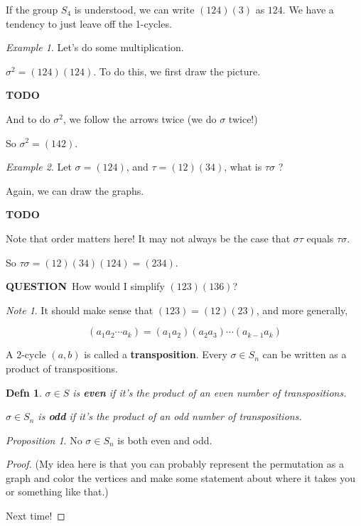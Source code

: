 \documentclass[12pt]{article}
\def\TODO{\color{red}\textbf{TODO}\color{black}}
\def\QUESTION{\color{red}\textbf{QUESTION}\color{black}\,}
\newtheorem{definition}{Defn}
\theoremstyle{remark}
\newtheorem{proposition}{Proposition}
\theoremstyle{remark}
\theoremstyle{remark}
\newtheorem{example}{Example}
\theoremstyle{remark}
\theoremstyle{remark}
\newtheorem*{note}{Note}
\begin{document}
If the group $S_4$ is understood, we can write $(124)(3)$ as $124$. We have a
tendency to just leave off the 1-cycles.

\begin{example}
  Let's do some multiplication.

  $\sigma^2 = (124)(124)$. To do this, we first draw the picture.

  \TODO{}

  And to do $\sigma^2$, we follow the arrows twice (we do $\sigma$ twice!)

  So $\sigma^2 = (142)$.
\end{example}

\begin{example}
  Let $\sigma = (124)$, and $\tau = (12)(34)$, what is $\tau \sigma$ ?

  Again, we can draw the graphs.

  \TODO{}

  Note that order matters here! It may not always be the case that $\sigma \tau$
  equals $\tau \sigma$.

  So $\tau \sigma = (12)(34)(124) = (234)$.
\end{example}

\QUESTION{} How would I simplify $(123)(136)$?

\begin{note}
  It should make sense that $(123) = (12)(23)$, and more generally,

  \[
    (a_1 a_2 \cdots a_k) = (a_1 a_2) (a_2 a_3) \cdots (a_{k - 1} a_k)
  \]
\end{note}

A 2-cycle $(a, b)$ is called a {\bf transposition}. Every $\sigma \in S_n$ can
be written as a product of transpositions.

\begin{definition}
  $\sigma \in S$ is {\bf even} if it's the product of an even number of transpositions.

  $\sigma \in S_n$ is {\bf odd} if it's the product of an odd number of transpositions.
\end{definition}

\begin{proposition}
  No $\sigma \in S_n$ is both even and odd.
\end{proposition}

\begin{proof}
  (My idea here is that you can probably represent the permutation as a graph and
  color the vertices and make some statement about where it takes you or something
  like that.)

  Next time!
\end{proof}
\end{document}

